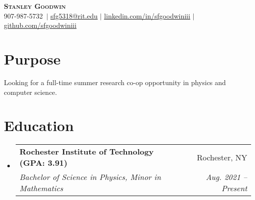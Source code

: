 \documentclass[letterpaper,11pt]{article}
\makeatletter
\newcommand{\resumeSubheading}[4]{
  \vspace{-2pt}\item
    \begin{tabular*}{0.97\textwidth}[t]{l@{\extracolsep{\fill}}r}
      \textbf{#1} & #2 \\
      \textit{\small#3} & \textit{\small #4} \\
    \end{tabular*}\vspace{-7pt}
}
\newcommand{\resumeSubHeadingListStart}{\begin{itemize}[leftmargin=0.15in, label={}]}
\newcommand{\resumeSubHeadingListEnd}{\end{itemize}}
\def \username {Stanley Goodwin}
\def \userphonenumber {907-987-5732}
\def \useremailaddress {sfg5318@rit.edu}
\def \userlinkedin {linkedin.com/in/sfgoodwiniii}
\def \usergithub {github.com/sfgoodwiniii}
\def \userwebsite {sfgoodwiniii.github.io/}
\def \currentGPARIT {3.91}
\makeatother
\begin{document}

\begin{center}
  \textbf{\Huge \scshape \username} \\ \vspace{1pt}
  \small \userphonenumber \ $|$
  \href{mailto:\useremailaddress}{\underline{\useremailaddress}} $|$
  \href{https://\userlinkedin}{\underline{\userlinkedin}} $|$
  \href{https://\usergithub}{\underline{\usergithub}}
\end{center}




\section{Purpose}
Looking for a full-time summer research co-op opportunity in physics and computer science.



\section{Education}

\resumeSubHeadingListStart

  \resumeSubheading
    {Rochester Institute of Technology (GPA: \currentGPARIT)}{Rochester, NY}
    {Bachelor of Science in Physics, Minor in Mathematics}{Aug. 2021 -- Present}
  

\resumeSubHeadingListEnd
\end{document}
